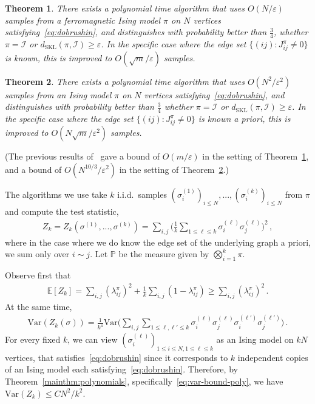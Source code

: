 \documentclass[reqno,11pt]{amsart}
\numberwithin{equation}{section}
\renewcommand{\epsilon}{\varepsilon}
\newtheorem{theorem}{Theorem}[section]
\theoremstyle{definition}{
\newtheorem{example}[theorem]{Example}
\newtheorem{definition}[theorem]{Definition}
\newtheorem*{definition*}{Definition}
\newtheorem{problem}[theorem]{Problem}
\newtheorem{question}[theorem]{Question}
\newtheorem{remark}[theorem]{Remark}
}
\renewcommand{\epsilon}{\varepsilon}
\begin{document}
\begin{theorem}\label{thm:app-ferromagnetic}
There exists a polynomial time algorithm that uses $O( N/ \epsilon)$ samples from a ferromagnetic Ising model $\pi$ on $N$ vertices satisfying~\eqref{eq:dobrushin}, and distinguishes with probability better than $\frac{3}{4}$, whether $\pi = \mathcal I$ or $d_{\mathrm{SKL}}(\pi,\mathcal I) \geq \epsilon$. In the specific case where the edge set $\{(ij): J^{\pi}_{ij} \neq 0\}$ is known, this is improved to $O(\sqrt{m}/ \epsilon)$ samples.
\end{theorem}

\begin{theorem}\label{thm:app-general}
There exists a polynomial time algorithm that uses $O(N^2/ \epsilon^2)$ samples from an Ising model $\pi$ on $N$ vertices satisfying~\eqref{eq:dobrushin}, and distinguishes with probability better than $\frac{3}{4}$ whether $\pi = \mathcal I$ or $d_{\mathrm{SKL}}(\pi,\mathcal I) \geq \epsilon$. In the specific case where the edge set $\{(ij): J^{\pi}_{ij} \neq 0\}$ is known a priori, this is improved to $O(N\sqrt m/\epsilon^2)$ samples.
\end{theorem}

(The previous results of~\cite{DDK} gave a bound of $O(m/\epsilon)$ in the setting of Theorem~\ref{thm:app-ferromagnetic}, and a bound of $O(N^{10/3}/\epsilon^2)$ in the setting of Theorem~\ref{thm:app-general}.)

The algorithms we use take $k$ i.i.d.\ samples $(\sigma^{(1)}_i)_{i \leq N},...,(\sigma^{(k)}_{i})_{i \leq N}$ from $\pi$ and compute the test statistic, 
\begin{align}\label{eq:z-k}
Z_k= Z_k(\sigma^{(1)},...,\sigma^{(k)}) = \sum_{i, j} \bigg(\frac 1k \sum_{1\leq \ell \leq k} \sigma_{i}^{(\ell)} \sigma_j^{(\ell)}\bigg)^2\,,
\end{align}
where in the case where we do know the edge set of the underlying graph a priori, we sum only over $i\sim j$. 
 Let $\mathbb P$ be the measure given by $\bigotimes_{i=1}^k \pi$.

Observe first that 
\begin{align}\label{eq:z-k-mean}
\mathbb E[ Z_k] = \sum_{i, j} (\lambda_{ij}^\pi)^2 + \frac 1k \sum_{i, j}{(1-\lambda_{ij}^\pi)} \geq \sum_{i, j} (\lambda_{ij}^\pi)^2\,.
\end{align}
At the same time,  
\begin{align*}
\mathrm{Var}(Z_k(\sigma))= \frac 1{k^4} \mathrm{Var} \bigg(\sum_{i,j} \sum_{1\leq \ell,\ell'\leq k} \sigma_{i}^{(\ell)} \sigma_j^{(\ell)} \sigma_i^{(\ell')} \sigma_j^{(\ell')} \bigg)\,. 
\end{align*}
For every fixed $k$, we can view $(\sigma_i^{(\ell)})_{1 \leq i\leq N, 1\leq \ell \leq k}$ as an Ising model on $kN$ vertices, that satisfies~\eqref{eq:dobrushin} since it corresponds to $k$ independent copies of an Ising model each satisfying~\eqref{eq:dobrushin}. Therefore, by Theorem~\ref{mainthm:polynomials}, specifically~\eqref{eq:var-bound-poly}, we have $\mathrm{Var}(Z_k) \leq CN^2/k^2$.
\end{document}
